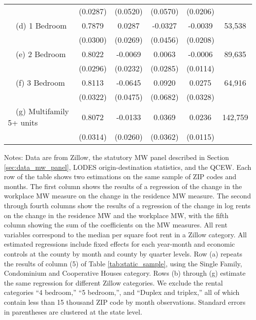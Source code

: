 \begin{landscape}
\begin{table}[ht!]
\begin{tabular}{@{}lccccc@{}}
                                                 & (0.0287) & (0.0520) & (0.0570) & (0.0206) &      \\
        $\quad$(d) 1 Bedroom                     &  0.7879  &  0.0287  &  -0.0327  &  -0.0039  & 53,538 \\
                                                 & (0.0300) & (0.0269) & (0.0456) & (0.0208) &      \\
        $\quad$(e) 2 Bedroom                     &  0.8022  &  -0.0069  &  0.0063  &  -0.0006  & 89,635 \\
                                                 & (0.0296) & (0.0232) & (0.0285) & (0.0114) &      \\
        $\quad$(f) 3 Bedroom                     &  0.8113  &  -0.0645  &  0.0920  &  0.0275  & 64,916 \\
                                                 & (0.0322) & (0.0475) & (0.0682) & (0.0328) &      \\
        $\quad$(g) Multifamily 5+ units          &  0.8072  &  -0.0133  &  0.0369  &  0.0236  & 142,759 \\
                                                 & (0.0314) & (0.0260) & (0.0362) & (0.0115) &      \\ \bottomrule
    \end{tabular}

    \begin{minipage}{.95\linewidth} \footnotesize
        \vspace{2mm}
        Notes:
        Data are from Zillow, the statutory MW panel described in
        Section \ref{sec:data_mw_panel}, LODES origin-destination statistics,
        and the QCEW.
        Each row of the table shows two estimations on the same sample of ZIP 
        codes and months.
        The first column shows the results of a regression of the change in the 
        workplace MW measure on the change in the residence MW measure.
        The second through fourth columns show the results of a regression of 
        the change in log rents on the change in the residence MW and the 
        workplace MW, with the fifth column showing the sum of the coefficients 
        on the MW measures.
        All rent variables correspond to the median per square foot rent in a 
        Zillow category.
        All estimated regressions include fixed effects for each year-month and 
        economic controls at the county by month and county by quarter levels.
        Row (a) repeats the results of column (5) of Table \ref{tab:static_sample}, 
        using the Single Family, Condominium and Cooperative Houses category.
        Rows (b) through (g) estimate the same regression for different Zillow 
        categories.
        We exclude the rental categories ``4 bedroom,'' ``5 bedroom,'', and
        ``Duplex and triplex,'' all of which contain less than 15 thousand
        ZIP code by month observations.
        Standard errors in parentheses are clustered at the state level.
    \end{minipage}
\end{table}
\end{landscape}
